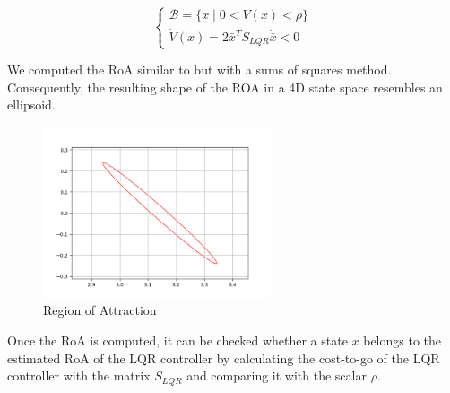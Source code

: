 \begin{equation}
\begin{cases}
    \mathcal{B} = \{ x \mid 0 < V(x) < \rho \} \\
    \dot{V}(x) = 2\bar{x}^T S_{LQR} \dot{\bar{x}} < 0
\end{cases}
\end{equation}

We computed the RoA similar to\cite{maywald2022co} but with a sums of squares method\cite{tedrake2010lqr}.  Consequently, the resulting shape of the ROA in a 4D state space resembles an ellipsoid.
\begin{figure}[htbp]
    \centering
    \includegraphics[width=0.6\textwidth]{figures/methodology/roaplot.png} %
    \caption{Region of Attraction}
    \label{fig:example}
\end{figure}

Once the RoA is computed, it can be checked whether a state \(x\) belongs to the estimated RoA of the LQR controller by calculating the cost-to-go of the LQR controller with the matrix \(S_{LQR}\) and comparing it with the scalar \(\rho\).

